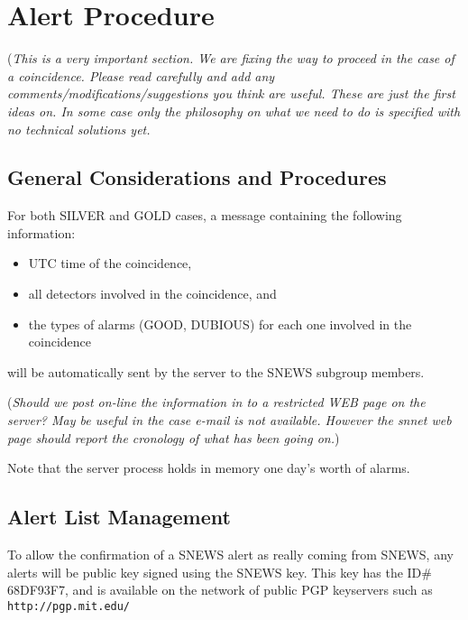 \documentclass{article}
\begin{document}
\section{Alert Procedure}
({\it This is a very important section. We are fixing the way to proceed
in the case of a coincidence. Please read carefully and add any 
comments/modifications/suggestions you think are useful. These are 
just the first ideas on. In some case  only the philosophy on what we need 
to do is specified with no technical solutions yet.}\\

\subsection{General Considerations and Procedures}

For both SILVER and GOLD cases, a message containing the following
information:

\begin{itemize}
\item UTC time of the coincidence,
\item all detectors involved in the coincidence, and
\item the types of alarms (GOOD, DUBIOUS) for each one involved
in the coincidence
\end{itemize}

will be automatically sent by the server to the SNEWS subgroup
members. 

({\it Should we post on-line the information in to a 
restricted WEB page on the server? May be useful in the case e-mail is not available. 
However the snnet web page should report the cronology of what has been going on.})

 
Note that the server process holds in memory one day's worth of
alarms.  

\subsection{Alert List Management}

To allow the confirmation of a SNEWS alert as really coming from SNEWS,
any alerts will be public key signed using the SNEWS key.  This key has
the ID\# 68DF93F7, and is available on the network of public PGP
keyservers such as \texttt{http://pgp.mit.edu/}
\end{document}
